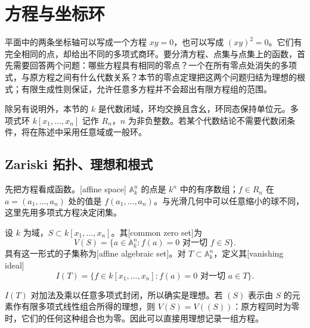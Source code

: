 
% 
% 

\section{方程与坐标环}
\label{g5:sec:0101}

平面中的两条坐标轴可以写成一个方程 \(xy=0\)，也可以写成 \((xy)^2=0\)。它们有完全相同的点，却给出不同的多项式商环。要分清方程、点集与点集上的函数，首先需要回答两个问题：哪些方程具有相同的零点？一个在所有零点处消失的多项式，与原方程之间有什么代数关系？本节的零点定理把这两个问题归结为理想的根式；有限生成性则保证，允许任意多方程并不会超出有限方程组的范围。

除另有说明外，本节的 \(k\) 是代数闭域，环均交换且含幺，环同态保持单位元。多项式环 \(k[x_1,\ldots,x_n]\) 记作 \(R_n\)，\(n\) 为非负整数。若某个代数结论不需要代数闭条件，将在陈述中采用任意域或一般环。

\subsection{Zariski 拓扑、理想和根式}
\label{g5:subsec:0101:01}

先把方程看成函数。[affine space] \(\mathbb A_k^n\) 的点是 \(k^n\) 中的有序数组；\(f\in R_n\) 在 \(a=(a_1,\ldots,a_n)\) 处的值是 \(f(a_1,\ldots,a_n)\)。与光滑几何中可以任意缩小的球不同，这里先用多项式方程决定闭集。

\begin{definition}\label{g5:def:affine-zero-set}
	设 \(k\) 为域，\(S\subset k[x_1,\ldots,x_n]\)。其[common zero set]为
	\[
		V(S)=\{a\in\mathbb A_k^n:f(a)=0\text{ 对一切 }f\in S\}.
	\]
	具有这一形式的子集称为[affine algebraic set]。对 \(T\subset\mathbb A_k^n\)，定义其[vanishing ideal]
	\[
		I(T)=\{f\in k[x_1,\ldots,x_n]:f(a)=0\text{ 对一切 }a\in T\}.
	\]
\end{definition}

\(I(T)\) 对加法及乘以任意多项式封闭，所以确实是理想。若 \((S)\) 表示由 \(S\) 的元素作有限多项式线性组合所得的理想，则 \(V(S)=V((S))\)：原方程同时为零时，它们的任何这种组合也为零。因此可以直接用理想记录一组方程。

